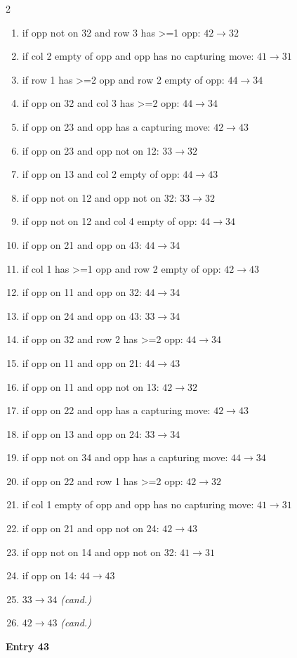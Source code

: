\begin{multicols}{2}
\begin{tikzpicture}[scale=0.24]
\end{tikzpicture}
\nopagebreak\begin{enumerate}[topsep=1pt,itemsep=0pt,parsep=0pt,leftmargin=2.2em,label=\arabic*.]
\item if opp not on 32 and row 3 has >=1 opp: $42\!\to\!32$
\item if col 2 empty of opp and opp has no capturing move: $41\!\to\!31$
\item if row 1 has >=2 opp and row 2 empty of opp: $44\!\to\!34$
\item if opp on 32 and col 3 has >=2 opp: $44\!\to\!34$
\item if opp on 23 and opp has a capturing move: $42\!\to\!43$
\item if opp on 23 and opp not on 12: $33\!\to\!32$
\item if opp on 13 and col 2 empty of opp: $44\!\to\!43$
\item if opp not on 12 and opp not on 32: $33\!\to\!32$
\item if opp not on 12 and col 4 empty of opp: $44\!\to\!34$
\item if opp on 21 and opp on 43: $44\!\to\!34$
\item if col 1 has >=1 opp and row 2 empty of opp: $42\!\to\!43$
\item if opp on 11 and opp on 32: $44\!\to\!34$
\item if opp on 24 and opp on 43: $33\!\to\!34$
\item if opp on 32 and row 2 has >=2 opp: $44\!\to\!34$
\item if opp on 11 and opp on 21: $44\!\to\!43$
\item if opp on 11 and opp not on 13: $42\!\to\!32$
\item if opp on 22 and opp has a capturing move: $42\!\to\!43$
\item if opp on 13 and opp on 24: $33\!\to\!34$
\item if opp not on 34 and opp has a capturing move: $44\!\to\!34$
\item if opp on 22 and row 1 has >=2 opp: $42\!\to\!32$
\item if col 1 empty of opp and opp has no capturing move: $41\!\to\!31$
\item if opp on 21 and opp not on 24: $42\!\to\!43$
\item if opp not on 14 and opp not on 32: $41\!\to\!31$
\item if opp on 14: $44\!\to\!43$
\item $33\!\to\!34$ \hfill\textit{(cand.)}
\item $42\!\to\!43$ \hfill\textit{(cand.)}
\end{enumerate}\smallskip
\noindent\textbf{Entry 43} \; 
\end{multicols}
